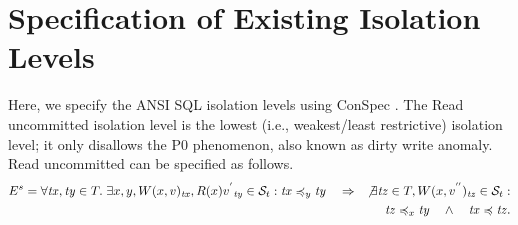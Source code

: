 \documentclass[acmlarge, ,11pt]{acmart}
\begin{document}
 \section{Specification of Existing Isolation Levels}
 Here, we specify the ANSI SQL isolation levels using ConSpec \cite{Berenson:1995:CAS:223784.223785}.  The Read uncommitted isolation level is the lowest (i.e., weakest/least restrictive) isolation level; it only disallows the P0 phenomenon, also known as dirty write anomaly.  Read uncommitted can be specified as follows. 
   \begin{align}\label{eqn:readuncomm}
\begin{split}
 E^{s} = \forall \mathit{tx}, \mathit{ty} \in T. \;  \exists x, y, W(x,v)_{\mathit{tx}}, R(x){v^{'}}_{\mathit{ty}} \in  \mathcal{S}_t: 
  \mathit{tx} \preccurlyeq_y {\mathit{ty}} \quad \Rightarrow  \quad \not \exists \mathit{tz} \in T, W(x,v^{''})_{\mathit{tz}} \in  \mathcal{S}_t: \\
   \mathit{tz} \preccurlyeq_x {\mathit{ty}} \quad \wedge \quad \mathit{tx} \preccurlyeq {\mathit{tz}}.
\end{split}
  \end{align}
\end{document}
